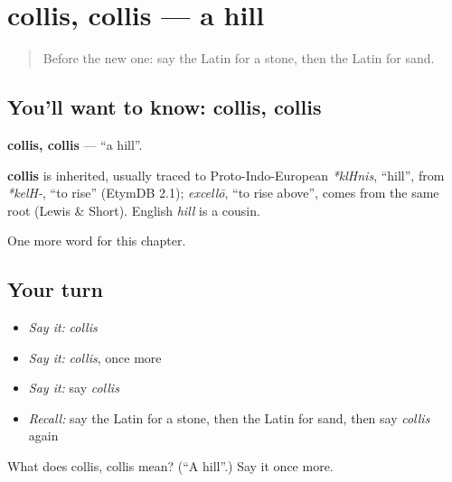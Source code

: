 \section[collis, collis]{collis, collis — a hill}

\label{lesson:LA-C88-collis}



\begin{quote}
Before the new one: say the Latin for a stone, then the Latin for sand.
\end{quote}

\subsection*{You'll want to know: collis, collis}
\textbf{collis, collis} — \textquotedblleft{}a hill\textquotedblright{}.

\begin{cousinweb}
\textbf{collis} is inherited, usually traced to Proto-Indo-European \emph{*klHnis}, \textquotedblleft{}hill\textquotedblright{}, from \emph{*kelH-}, \textquotedblleft{}to rise\textquotedblright{} (EtymDB 2.1); \emph{excellō}, \textquotedblleft{}to rise above\textquotedblright{}, comes from the same root (Lewis \& Short). English \emph{hill} is a cousin.
\end{cousinweb}

\begin{grammarlens}[title={What you've built}]
One more word for this chapter.
\end{grammarlens}

\subsection*{Your turn}
\begin{itemize}
\raggedright
  \item \emph{Say it:} \emph{collis}
  \item \emph{Say it:} \emph{collis}, once more
  \item \emph{Say it:} say \emph{collis}
  \item \emph{Recall:} say the Latin for a stone, then the Latin for sand, then say \emph{collis} again
\end{itemize}

\begin{tcolorbox}[breakable,colback=teal!4,colframe=teal!35!black,title={Before you move on}]
What does collis, collis mean? (\textquotedblleft{}A hill\textquotedblright{}.) Say it once more.
\end{tcolorbox}
